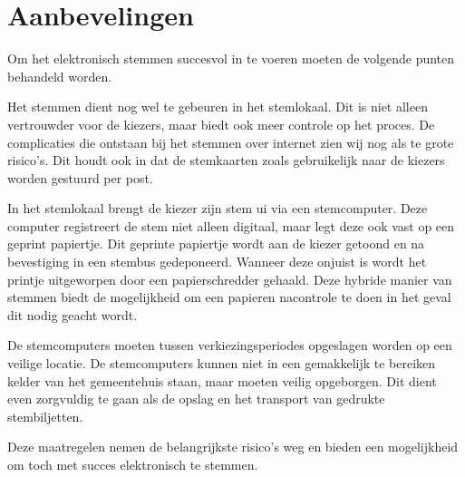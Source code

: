 \documentclass[a4paper]{article}
\begin{document}
\section{Aanbevelingen}
Om het elektronisch stemmen succesvol in te voeren moeten de volgende punten behandeld worden.

Het stemmen dient nog wel te gebeuren in het stemlokaal.
Dit is niet alleen vertrouwder voor de kiezers, maar biedt ook meer controle op het proces.
De complicaties die ontstaan bij het stemmen over internet zien wij nog als te grote risico's.
Dit houdt ook in dat de stemkaarten zoals gebruikelijk naar de kiezers worden gestuurd per post.

In het stemlokaal brengt de kiezer zijn stem ui via een stemcomputer.
Deze computer registreert de stem niet alleen digitaal, maar legt deze ook vast op een geprint papiertje.
Dit geprinte papiertje wordt aan de kiezer getoond en na bevestiging in een stembus gedeponeerd.
Wanneer deze onjuist is wordt het printje uitgeworpen door een papierschredder gehaald. 
Deze hybride manier van stemmen biedt de mogelijkheid om een papieren nacontrole te doen in het geval dit nodig geacht wordt. 

De stemcomputers moeten tussen verkiezingsperiodes opgeslagen worden op een veilige locatie.
De stemcomputers kunnen niet in een gemakkelijk te bereiken kelder van het gemeentehuis staan, maar moeten veilig opgeborgen.
Dit dient even zorgvuldig te gaan als de opslag en het transport van gedrukte stembiljetten.

Deze maatregelen nemen de belangrijkste risico's weg en bieden een mogelijkheid om toch met succes elektronisch te stemmen.



\renewcommand\refname{Literatuur}

\end{document}
